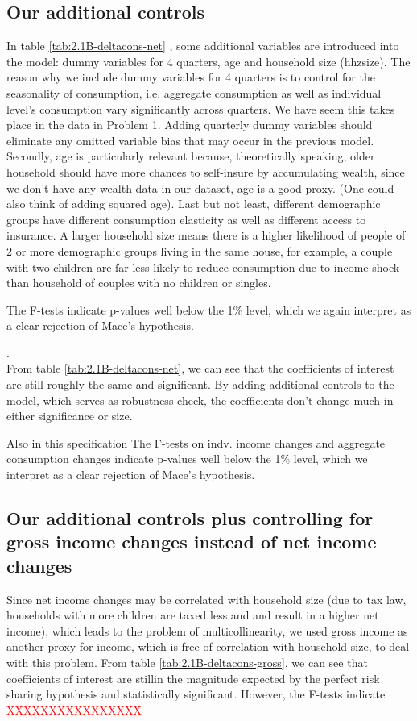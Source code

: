 \documentclass[12pt,a4paper]{article}
\begin{document}
\subsection*{Our additional controls}

In table \ref{tab:2.1B-deltacons-net} , some additional variables are introduced into the model: dummy variables for 4 quarters, age and household size (hhzsize). The reason why we include dummy variables for 4 quarters is to control for the seasonality of consumption, i.e. aggregate consumption as well as individual level's consumption vary significantly across quarters. We have seem this takes place in the data in Problem 1. Adding quarterly dummy variables should eliminate any omitted variable bias that may occur in the previous model. Secondly, age is particularly relevant because, theoretically speaking, older household should have more chances to self-insure by accumulating wealth, since we don't have any wealth data in our dataset, age is a good proxy. (One could also think of adding squared age). Last but not least, different demographic groups have different consumption elasticity as well as different access to insurance. A larger household size means there is a higher likelihood of people of 2 or more demographic groups living in the same house, for example, a couple with two children are far less likely to reduce consumption due to income shock than household of couples with no children or singles.

The F-tests indicate p-values well below the 1\% level, which we again interpret as a clear rejection of Mace's hypothesis. 

. \\

From table \ref{tab:2.1B-deltacons-net}, we can see that the coefficients of interest are still roughly the same and significant. By adding additional controls to the model, which serves as robustness check, the coefficients don't change much in either significance or size. 

Also in this specification The F-tests on indv. income changes and aggregate consumption changes indicate p-values well below the 1\% level, which we interpret as a clear rejection of Mace's hypothesis. 

\subsection*{Our additional controls plus controlling for gross income changes instead of net income changes}
Since net income changes may be correlated with household size (due to tax law, households with more children are taxed less and and result in a higher net income), which leads to the problem of multicollinearity, we used gross income as another proxy for income, which is free of correlation with household size, to deal with this problem. From table \ref{tab:2.1B-deltacons-gross}, we can see that coefficients of interest are stillin the magnitude expected by the perfect risk sharing hypothesis and statistically significant. However, the F-tests indicate \textcolor{red}{XXXXXXXXXXXXXXXX}
\end{document}
